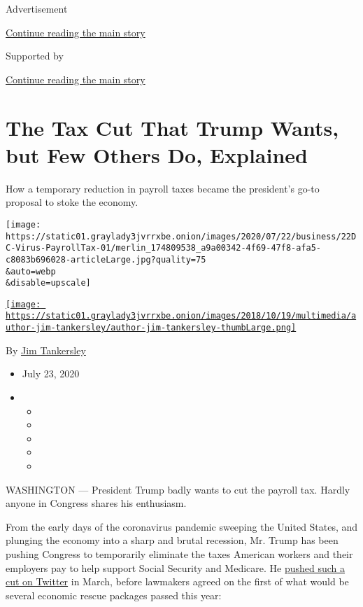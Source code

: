 Advertisement

\protect\hyperlink{after-top}{Continue reading the main story}

Supported by

\protect\hyperlink{after-sponsor}{Continue reading the main story}

\hypertarget{the-tax-cut-that-trump-wants-but-few-others-do-explained}{%
\section{The Tax Cut That Trump Wants, but Few Others Do,
Explained}\label{the-tax-cut-that-trump-wants-but-few-others-do-explained}}

How a temporary reduction in payroll taxes became the president's go-to
proposal to stoke the economy.

\texttt{[image: https://static01.graylady3jvrrxbe.onion/images/2020/07/22/business/22DC-Virus-PayrollTax-01/merlin\_174809538\_a9a00342-4f69-47f8-afa5-c8083b696028-articleLarge.jpg?quality=75\\\&auto=webp\\\&disable=upscale]}

\href{https://www.nytimes3xbfgragh.onion/by/jim-tankersley}{\texttt{[image: https://static01.graylady3jvrrxbe.onion/images/2018/10/19/multimedia/author-jim-tankersley/author-jim-tankersley-thumbLarge.png]}}

By \href{https://www.nytimes3xbfgragh.onion/by/jim-tankersley}{Jim
Tankersley}

\begin{itemize}
\item
  July 23, 2020
\item
  \begin{itemize}
  \item
  \item
  \item
  \item
  \item
  \end{itemize}
\end{itemize}

WASHINGTON --- President Trump badly wants to cut the payroll tax.
Hardly anyone in Congress shares his enthusiasm.

From the early days of the coronavirus pandemic sweeping the United
States, and plunging the economy into a sharp and brutal recession, Mr.
Trump has been pushing Congress to temporarily eliminate the taxes
American workers and their employers pay to help support Social Security
and Medicare. He
\href{https://twitter.com/realDonaldTrump/status/1237924658185469954}{pushed
such a cut on Twitter} in March, before lawmakers agreed on the first of
what would be several economic rescue packages passed this year:

